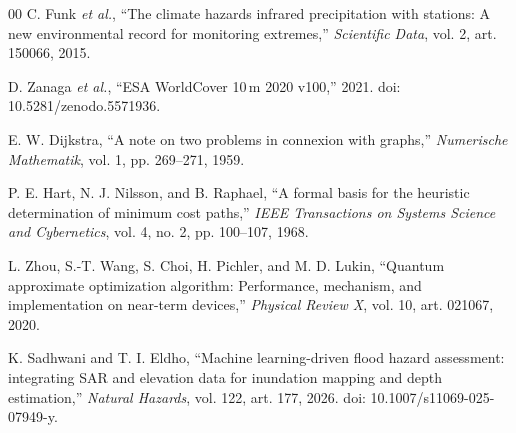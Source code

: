 \documentclass[conference]{IEEEtran}
\begin{document}
\begin{thebibliography}{00}
 C. Funk \emph{et al.}, ``The climate hazards infrared precipitation with stations: A new environmental record for monitoring extremes,'' \emph{Scientific Data}, vol. 2, art. 150066, 2015.

 D. Zanaga \emph{et al.}, ``ESA WorldCover 10\,m 2020 v100,'' 2021. doi: 10.5281/zenodo.5571936.

 E. W. Dijkstra, ``A note on two problems in connexion with graphs,'' \emph{Numerische Mathematik}, vol. 1, pp. 269--271, 1959.

 P. E. Hart, N. J. Nilsson, and B. Raphael, ``A formal basis for the heuristic determination of minimum cost paths,'' \emph{IEEE Transactions on Systems Science and Cybernetics}, vol. 4, no. 2, pp. 100--107, 1968.

 L. Zhou, S.-T. Wang, S. Choi, H. Pichler, and M. D. Lukin, ``Quantum approximate optimization algorithm: Performance, mechanism, and implementation on near-term devices,'' \emph{Physical Review X}, vol. 10, art. 021067, 2020.

 K. Sadhwani and T. I. Eldho, ``Machine learning-driven flood hazard assessment: integrating SAR and elevation data for inundation mapping and depth estimation,'' \emph{Natural Hazards}, vol. 122, art. 177, 2026. doi: 10.1007/s11069-025-07949-y.

\end{thebibliography}
\end{document}
